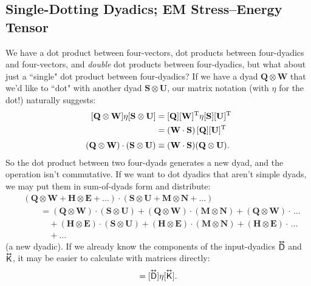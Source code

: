 \documentclass[12pt]{article}
\renewcommand{\vv}[1]{\mathbf{#1}}
\newcommand{\tightoverset}[2]{%
  \mathop{#2}\limits^{\vbox to -.5ex{\kern-0.75ex\hbox{$#1$}\vss}}}
\newcommand{\inlinedy}[1]{\tightoverset{\text{\tiny$\bm\leftrightarrow$}}{#1}}
\newcommand{\capdy}[1]{ \overset{ \text{\tiny$\bm\leftrightarrow$} }{\vphantom{\text{\small{A}}}\smash{#1}} }
\begin{document}
\subsection{Single-Dotting Dyadics; EM Stress--Energy Tensor}\label{sssec:sdfd}

We have a dot product between four-vectors, dot products between four-dyadics and four-vectors, and \emph{double} dot products between four-dyadics, but what about just a ``single" dot product between four-dyadics? If we have a dyad $\vv Q \otimes \vv W$ that we'd like to ``dot" with another dyad $\vv S \otimes \vv U$, our matrix notation (with $\eta$ for the dot!) naturally suggests:
\begin{equation*}
\begin{aligned}
\mkern0mu [ \vv Q \otimes \vv W ] \eta [ \vv S \otimes \vv U ] &= [\vv Q][\vv W]^{\mathrm{T}} \eta [\vv S][\vv U]^{\mathrm{T}} \\
&= (\vv W \cdot \vv S) \, [\vv Q] [\vv U]^{\mathrm{T}} \\[3pt]
(\vv Q \otimes \vv W) \cdot (\vv S \otimes \vv U) & \equiv (\vv W \cdot \vv S) (\vv Q \otimes \vv U) .
\end{aligned}
\end{equation*}
So the dot product between two four-dyads generates a new dyad, and the operation isn't commutative. If we want to dot dyadics that aren't simple dyads, we may put them in sum-of-dyads form and distribute:
\begin{equation*}
\begin{aligned}
&(\vv Q \otimes \vv W + \vv H \otimes \vv E + \dots ) \cdot (\vv S \otimes \vv U + \vv M \otimes \vv N + \dots ) \\[3pt]
&\qquad = (\vv Q \otimes \vv W) \cdot (\vv S \otimes \vv U) + (\vv Q \otimes \vv W) \cdot (\vv M \otimes \vv N) + (\vv Q \otimes \vv W) \cdot \, \dots \\
& \qquad \quad + (\vv H \otimes \vv E) \cdot (\vv S \otimes \vv U) + (\vv H \otimes \vv E) \cdot (\vv M \otimes \vv N) + (\vv H \otimes \vv E) \cdot \, \dots \\
& \qquad \quad + \dots
\end{aligned}
\end{equation*}
(a new dyadic). If we already know the components of the input-dyadics $\inlinedy{\mathsf{D}}$ and $\inlinedy{\mathsf{K}}$, it may be easier to calculate with matrices directly:
\begin{equation*}
[\capdy{\mathsf{D}} \cdot \capdy{\mathsf{K}}] = [\capdy{\mathsf{D}}] \eta [\capdy{\mathsf{K}}] .
\end{equation*}
\end{document}
